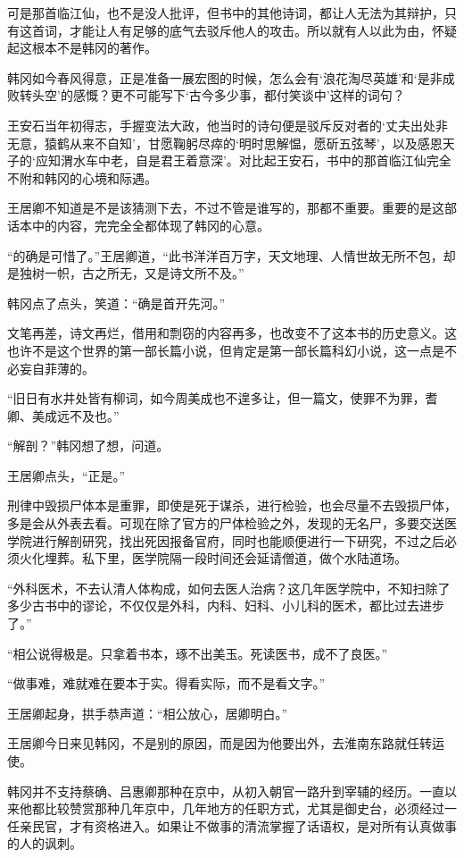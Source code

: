 可是那首临江仙，也不是没人批评，但书中的其他诗词，都让人无法为其辩护，只有这首词，才能让人有足够的底气去驳斥他人的攻击。所以就有人以此为由，怀疑起这根本不是韩冈的著作。

韩冈如今春风得意，正是准备一展宏图的时候，怎么会有‘浪花淘尽英雄’和‘是非成败转头空’的感慨？更不可能写下‘古今多少事，都付笑谈中’这样的词句？

王安石当年初得志，手握变法大政，他当时的诗句便是驳斥反对者的‘丈夫出处非无意，猿鹤从来不自知’，甘愿鞠躬尽瘁的‘明时思解愠，愿斫五弦琴’，以及感恩天子的‘应知渭水车中老，自是君王着意深’。对比起王安石，书中的那首临江仙完全不附和韩冈的心境和际遇。

王居卿不知道是不是该猜测下去，不过不管是谁写的，那都不重要。重要的是这部话本中的内容，完完全全都体现了韩冈的心意。

“的确是可惜了。”王居卿道，“此书洋洋百万字，天文地理、人情世故无所不包，却是独树一帜，古之所无，又是诗文所不及。”

韩冈点了点头，笑道：“确是首开先河。”

文笔再差，诗文再烂，借用和剽窃的内容再多，也改变不了这本书的历史意义。这也许不是这个世界的第一部长篇小说，但肯定是第一部长篇科幻小说，这一点是不必妄自菲薄的。

“旧日有水井处皆有柳词，如今周美成也不遑多让，但一篇文，使罪不为罪，耆卿、美成远不及也。”

“解剖？”韩冈想了想，问道。

王居卿点头，“正是。”

刑律中毁损尸体本是重罪，即使是死于谋杀，进行检验，也会尽量不去毁损尸体，多是会从外表去看。可现在除了官方的尸体检验之外，发现的无名尸，多要交送医学院进行解剖研究，找出死因报备官府，同时也能顺便进行一下研究，不过之后必须火化埋葬。私下里，医学院隔一段时间还会延请僧道，做个水陆道场。

“外科医术，不去认清人体构成，如何去医人治病？这几年医学院中，不知扫除了多少古书中的谬论，不仅仅是外科，内科、妇科、小儿科的医术，都比过去进步了。”

“相公说得极是。只拿着书本，琢不出美玉。死读医书，成不了良医。”

“做事难，难就难在要本于实。得看实际，而不是看文字。”

王居卿起身，拱手恭声道：“相公放心，居卿明白。”

王居卿今日来见韩冈，不是别的原因，而是因为他要出外，去淮南东路就任转运使。

韩冈并不支持蔡确、吕惠卿那种在京中，从初入朝官一路升到宰辅的经历。一直以来他都比较赞赏那种几年京中，几年地方的任职方式，尤其是御史台，必须经过一任亲民官，才有资格进入。如果让不做事的清流掌握了话语权，是对所有认真做事的人的讽刺。

